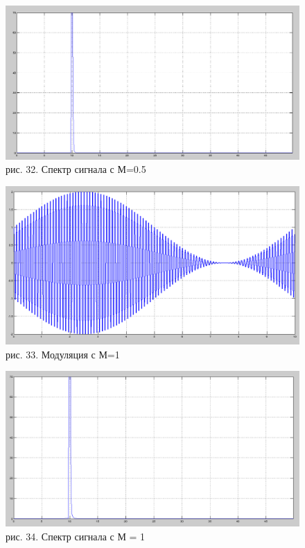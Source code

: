 \documentclass[10pt,a4paper]{report}
\begin{document}
\begin{figure}
\begin{center}
\includegraphics[width=150mm, scale = 0.9]{7_4.png}\newline
рис. 32. Спектр сигнала с М=0.5\newline
\end{center}
\end{figure}
\begin{figure}
\begin{center}
\includegraphics[width=150mm, scale = 0.9]{7_5.png}\newline
рис. 33. Модуляция с М=1\newline
\end{center}
\end{figure}
\begin{figure}
\begin{center}
\includegraphics[width=150mm, scale = 0.9]{7_6.png}\newline
рис. 34. Спектр сигнала с М = 1\newline
\end{center}
\end{figure}
\end{document}
